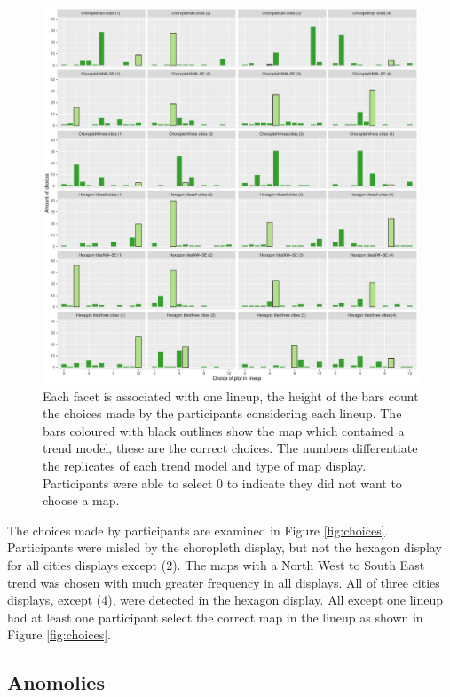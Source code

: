 \documentclass[conference,final,]{IEEEtran}
\makeatletter
\def\maxwidth{\ifdim\Gin@nat@width>\linewidth\linewidth
\else\Gin@nat@width\fi}
\let\Oldincludegraphics\includegraphics
\renewcommand{\includegraphics}[1]{\Oldincludegraphics[width=\maxwidth]{#1}}
\makeatother
\begin{document}
\begin{figure}
\centering
\includegraphics{paper_files/figure-latex/choices-1.pdf}
\caption{Each facet is associated with one lineup, the height of the
bars count the choices made by the participants considering each lineup.
The bars coloured with black outlines show the map which contained a
trend model, these are the correct choices. The numbers differentiate
the replicates of each trend model and type of map display. Participants
were able to select 0 to indicate they did not want to choose a map.}
\end{figure}

The choices made by participants are examined in Figure
\ref{fig:choices}. Participants were misled by the choropleth display,
but not the hexagon display for all cities displays except (2). The maps
with a North West to South East trend was chosen with much greater
frequency in all displays. All of three cities displays, except (4),
were detected in the hexagon display. All except one lineup had at least
one participant select the correct map in the lineup as shown in Figure
\ref{fig:choices}.

\hypertarget{anomolies}{%
\subsection{Anomolies}\label{anomolies}}
\end{document}
